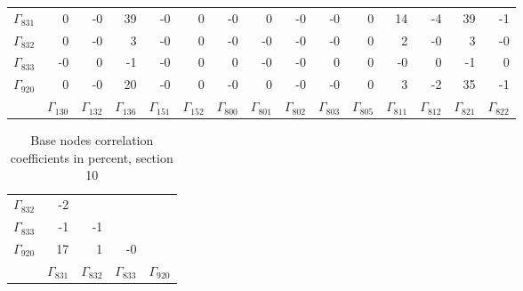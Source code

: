 {\begin{table}
\begin{center}
\begin{minipage}{\linewidth}
\begin{center}
\begin{envsmall}
\begin{center}
\renewcommand*{\arraystretch}{1.1}%
\begin{tabular}{rrrrrrrrrrrrrrr}
\hline
\( \Gamma_{831} \) &    0 &   -0 &   39 &   -0 &    0 &   -0 &    0 &   -0 &   -0 &    0 &   14 &   -4 &   39 &   -1 \\
\( \Gamma_{832} \) &    0 &   -0 &    3 &   -0 &    0 &   -0 &   -0 &   -0 &   -0 &    0 &    2 &   -0 &    3 &   -0 \\
\( \Gamma_{833} \) &   -0 &    0 &   -1 &   -0 &    0 &    0 &   -0 &   -0 &    0 &    0 &   -0 &    0 &   -1 &    0 \\
\( \Gamma_{920} \) &    0 &   -0 &   20 &   -0 &    0 &   -0 &    0 &   -0 &   -0 &    0 &    3 &   -2 &   35 &   -1 \\
 & \( \Gamma_{130} \) & \( \Gamma_{132} \) & \( \Gamma_{136} \) & \( \Gamma_{151} \) & \( \Gamma_{152} \) & \( \Gamma_{800} \) & \( \Gamma_{801} \) & \( \Gamma_{802} \) & \( \Gamma_{803} \) & \( \Gamma_{805} \) & \( \Gamma_{811} \) & \( \Gamma_{812} \) & \( \Gamma_{821} \) & \( \Gamma_{822} \)
\\\hline
\end{tabular}
\end{center}
\end{envsmall}
\ifhevea\else
\end{center}
\end{minipage}
\fi
\end{center}
\ifhevea\end{table}\fi
\ifhevea\begin{table}\fi%
\begin{center}
\ifhevea
\caption{Base nodes correlation coefficients in percent, section 10\label{tab:tau:br-fit-corr10}}%
\else
\begin{minipage}{\linewidth}
\begin{center}
\label{tab:tau:br-fit-corr10}%
\fi
\begin{envsmall}
\begin{center}
\renewcommand*{\arraystretch}{1.1}%
\begin{tabular}{rrrrr}
\hline
\( \Gamma_{832} \) &   -2 &  &  &  \\
\( \Gamma_{833} \) &   -1 &   -1 &  &  \\
\( \Gamma_{920} \) &   17 &    1 &   -0 &  \\
 & \( \Gamma_{831} \) & \( \Gamma_{832} \) & \( \Gamma_{833} \) & \( \Gamma_{920} \)
\\\hline
\end{tabular}
\end{center}
\end{envsmall}
\ifhevea\else
\end{center}
\end{minipage}
\fi
\end{center}
\ifhevea\end{table}\fi}%
